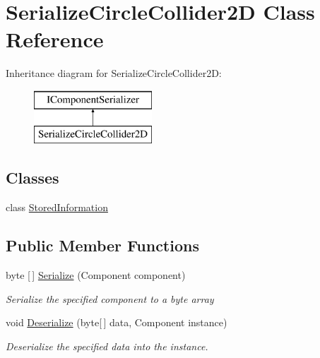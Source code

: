 \hypertarget{class_serialize_circle_collider2_d}{}\section{Serialize\+Circle\+Collider2D Class Reference}
\label{class_serialize_circle_collider2_d}
Inheritance diagram for Serialize\+Circle\+Collider2D\+:\begin{figure}[H]
\begin{center}
\leavevmode
\includegraphics[height=2.000000cm]{class_serialize_circle_collider2_d}
\end{center}
\end{figure}
\subsection*{Classes}
\begin{DoxyCompactItemize}
\item 
class \hyperlink{class_serialize_circle_collider2_d_1_1_stored_information}{Stored\+Information}
\end{DoxyCompactItemize}
\subsection*{Public Member Functions}
\begin{DoxyCompactItemize}
\item 
byte \mbox{[}$\,$\mbox{]} \hyperlink{class_serialize_circle_collider2_d_afc9c9861ba6c6c9949d56c851dd095fa}{Serialize} (Component component)
\begin{DoxyCompactList}\small\item\em Serialize the specified component to a byte array \end{DoxyCompactList}\item 
void \hyperlink{class_serialize_circle_collider2_d_ae96fe731156dd3dad5f854f9fcb7ac19}{Deserialize} (byte\mbox{[}$\,$\mbox{]} data, Component instance)
\begin{DoxyCompactList}\small\item\em Deserialize the specified data into the instance. \end{DoxyCompactList}\end{DoxyCompactItemize}


